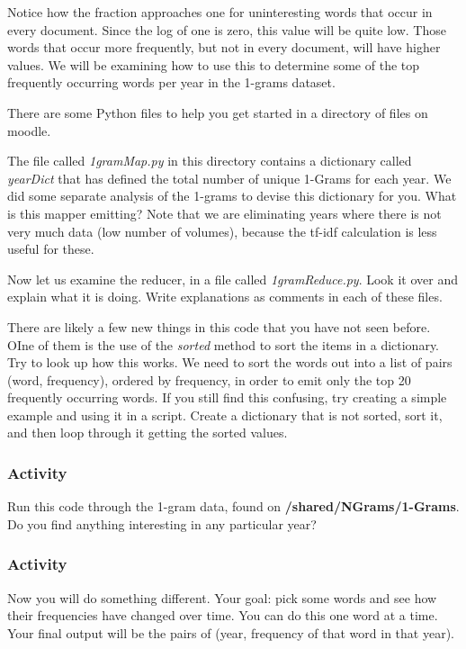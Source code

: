 \documentclass[letterpaper,10pt,openany,oneside]{sphinxmanual}
\begin{document}
Notice how the fraction approaches one for uninteresting words that
occur in every document. Since the log of one is zero, this value
will be quite low. Those words that occur more frequently, but not
in every document, will have higher values. We will be examining
how to use this to determine some of the top frequently occurring
words per year in the 1-grams dataset.

There are some Python files to help you get started in a directory
of files on moodle.

The file called \emph{1gramMap.py} in this directory contains a
dictionary called \emph{yearDict} that has defined the total number of
unique 1-Grams for each year. We did some separate analysis of the
1-grams to devise this dictionary for you. What is this mapper
emitting? Note that we are eliminating years where there is not
very much data (low number of volumes), because the tf-idf
calculation is less useful for these.

Now let us examine the reducer, in a file called \emph{1gramReduce.py}.
Look it over and explain what it is doing. Write explanations as
comments in each of these files.

There are likely a few new things in this code that you have not
seen before. OIne of them is the use of the \emph{sorted} method to sort
the items in a dictionary. Try to look up how this works. We need
to sort the words out into a list of pairs (word, frequency),
ordered by frequency, in order to emit only the top 20 frequently
occurring words. If you still find this confusing, try creating a
simple example and using it in a script. Create a dictionary that
is not sorted, sort it, and then loop through it getting the sorted
values.


\subsubsection{Activity}
\label{WmrActivities/WmrActivities:activity}
Run this code through the 1-gram data, found on \textbf{/shared/NGrams/1-Grams}. Do
you find anything interesting in any particular year?


\subsubsection{Activity}
\label{WmrActivities/WmrActivities:id4}
Now you will do something different. Your goal: pick some words and
see how their frequencies have changed over time. You can do this
one word at a time. Your final output will be the pairs of (year,
frequency of that word in that year).
\end{document}
